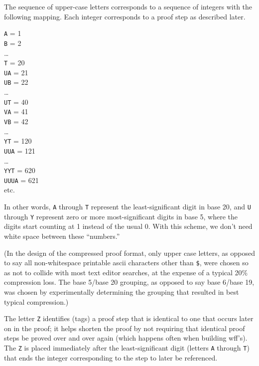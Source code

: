 The sequence of upper-case letters corresponds to a sequence of integers
with the following mapping.  Each integer corresponds to a proof step as
described later.
\begin{center}
  \texttt{A} = 1 \\
  \texttt{B} = 2 \\
   \ldots \\
  \texttt{T} = 20 \\
  \texttt{UA} = 21 \\
  \texttt{UB} = 22 \\
   \ldots \\
  \texttt{UT} = 40 \\
  \texttt{VA} = 41 \\
  \texttt{VB} = 42 \\
   \ldots \\
  \texttt{YT} = 120 \\
  \texttt{UUA} = 121 \\
   \ldots \\
  \texttt{YYT} = 620 \\
  \texttt{UUUA} = 621 \\
   etc.
\end{center}

In other words, \texttt{A} through \texttt{T} represent the
least-significant digit in base 20, and \texttt{U} through \texttt{Y}
represent zero or more most-significant digits in base 5, where the
digits start counting at 1 instead of the usual 0. With this scheme, we
don't need white space between these ``numbers.''

(In the design of the compressed proof format, only upper case letters,
as opposed to say all non-whitespace printable {\sc ascii} characters other than
\texttt{\$}, were chosen so as not to collide with most text editor
searches, at the expense of a typical 20\% compression
loss.  The base 5/base 20 grouping, as opposed to say base 6/base 19,
was chosen by experimentally determining the grouping that resulted in
best typical compression.)

The letter \texttt{Z} identifies (tags) a proof step that is identical to one
that occurs later on in the proof; it helps shorten the proof by not requiring
that identical proof steps be proved over and over again (which happens often
when building wff's).  The \texttt{Z} is placed immediately after the
least-significant digit (letters \texttt{A} through \texttt{T}) that ends the integer
corresponding to the step to later be referenced.

